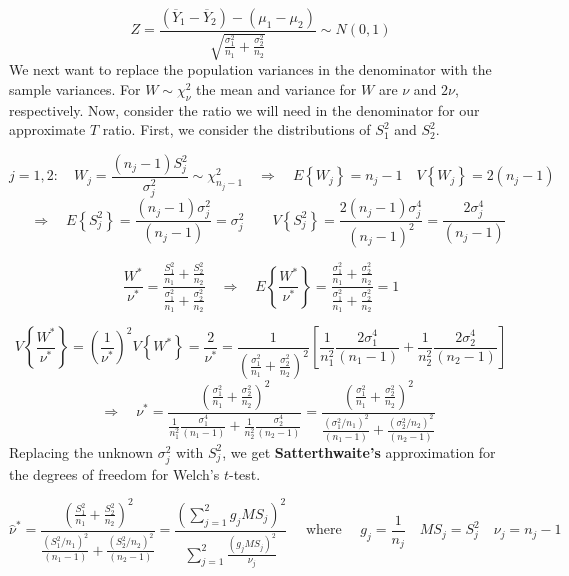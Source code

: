 \documentclass[
]{book}
\begin{document}
\[
Z=\frac{\left(\overline{Y}_1 - \overline{Y}_2\right)-\left(\mu_1 - \mu_2\right)}{
\sqrt{\frac{\sigma^2_1}{n_1}+\frac{\sigma_2^2}{n_2}}} \sim N(0,1)
\] We next want to replace the population variances in the denominator
with the sample variances. For \(W\sim \chi_{\nu}^2\) the mean and
variance for \(W\) are \(\nu\) and \(2\nu\), respectively. Now, consider
the ratio we will need in the denominator for our approximate \(T\)
ratio. First, we consider the distributions of \(S_1^2\) and \(S_2^2\).

\[
j=1,2: \quad W_j=\frac{\left(n_j-1\right)S_j^2}{\sigma_j^2} \sim \chi_{n_j-1}^2
\quad\Rightarrow\quad E\left\{W_j\right\}=n_j-1 \quad V\left\{W_j\right\}=
2\left(n_j-1\right)
\] \[
\quad\Rightarrow\quad E\left\{S_j^2\right\}=
\frac{\left(n_j-1\right)\sigma_j^2}{\left(n_j-1\right)}=\sigma_j^2 \qquad
V\left\{S_j^2\right\}=\frac{2\left(n_j-1\right)\sigma_j^4}{\left(n_j-1\right)^2}
=\frac{2\sigma_j^4}{\left(n_j-1\right)}
\]

\[
\frac{W^*}{\nu^*}=
\frac{\frac{S_1^2}{n_1}+\frac{S_2^2}{n_2}}{\frac{\sigma_1^2}{n_1}+\frac{\sigma_2^2}{n_2}} \quad 
\Rightarrow \quad E\left\{\frac{W^*}{\nu^*}\right\}=
\frac{\frac{\sigma^2_1}{n_1}+\frac{\sigma_2^2}{n_2}}{
\frac{\sigma^2_1}{n_1}+\frac{\sigma_2^2}{n_2}} = 1
\]

\[
V\left\{\frac{W^*}{\nu^*}\right\} = 
\left(\frac{1}{\nu^*}\right)^2V\left\{W^*\right\}=
\frac{2}{\nu^*}=
\frac{1}{\left(\frac{\sigma^2_1}{n_1}+\frac{\sigma_2^2}{n_2}\right)^2} \left[
\frac{1}{n_1^2}\frac{2\sigma_1^4}{\left(n_1-1\right)} + 
\frac{1}{n_2^2}\frac{2\sigma_2^4}{\left(n_2-1\right)}
\right]
\] \[
\quad\Rightarrow\quad \nu^*=
\frac{\left(\frac{\sigma^2_1}{n_1}+\frac{\sigma_2^2}{n_2}\right)^2}{
\frac{1}{n_1^2}\frac{\sigma_1^4}{\left(n_1-1\right)} + 
\frac{1}{n_2^2}\frac{\sigma_2^4}{\left(n_2-1\right)}}  =
\frac{\left(\frac{\sigma^2_1}{n_1}+\frac{\sigma_2^2}{n_2}\right)^2}{
\frac{\left(\sigma_1^2/n_1\right)^2}{\left(n_1-1\right)} + 
\frac{\left(\sigma_2^2/n_2\right)^2}{\left(n_2-1\right)}}
\] Replacing the unknown \(\sigma_j^2\) with \(S_j^2\), we get
\textbf{Satterthwaite's} approximation for the degrees of freedom for
Welch's \(t\)-test.

\[
\hat{\nu}^*=
\frac{\left(\frac{S_1^2}{n_1}+\frac{S_2^2}{n_2}\right)^2}{
\frac{\left(S_1^2/n_1\right)^2}{\left(n_1-1\right)} + 
\frac{\left(S_2^2/n_2\right)^2}{\left(n_2-1\right)}} = 
\frac{\left(\sum_{j=1}^2g_jMS_j\right)^2}{\sum_{j=1}^2
\frac{\left(g_jMS_j\right)^2}{\nu_j}}  \quad \mbox{ where } \quad
g_j=\frac{1}{n_j}  \quad MS_j=S_j^2 \quad \nu_j=n_j-1
\]
\end{document}
